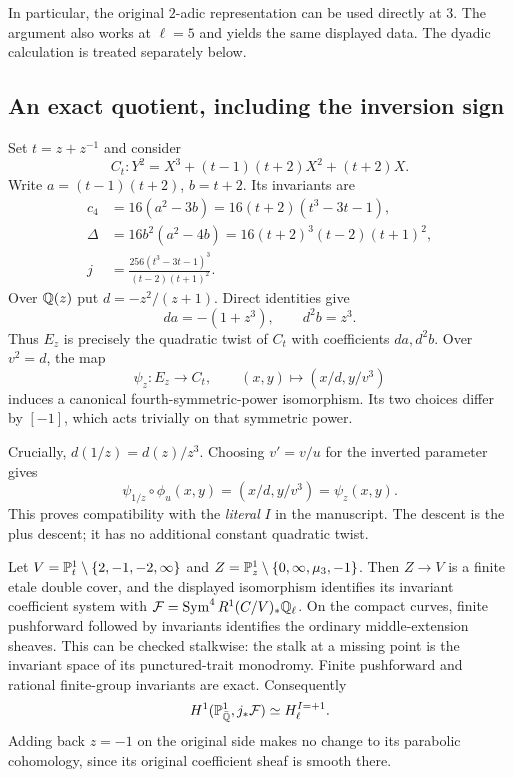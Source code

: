 In particular, the original $2$-adic representation can be used directly at
$3$. The argument also works at $\ell=5$ and yields the same displayed data.
The dyadic calculation is treated separately below.

\subsection{An exact quotient, including the inversion sign}
Set $t=z+z^{-1}$ and consider
\begin{equation}\label{p3:eq:family}
 C_t:Y^2=X^3+(t-1)(t+2)X^2+(t+2)X.
\end{equation}
Write $a=(t-1)(t+2)$, $b=t+2$. Its invariants are
\begin{align*}
 c_4&=16(a^2-3b)=16(t+2)(t^3-3t-1),\\
 \Delta&=16b^2(a^2-4b)=16(t+2)^3(t-2)(t+1)^2,\\
 j&=\frac{256(t^3-3t-1)^3}{(t-2)(t+1)^2}.
\end{align*}
Over $\mathbb Q(z)$ put $d=-z^2/(z+1)$. Direct identities give
\[
 da=-(1+z^3),\qquad d^2b=z^3.
\]
Thus $E_z$ is precisely the quadratic twist of $C_t$ with coefficients
$da,d^2b$. Over $v^2=d$, the map
\[
 \psi_z:E_z\longrightarrow C_t,\qquad(x,y)\longmapsto(x/d,y/v^3)
\]
induces a canonical fourth-symmetric-power isomorphism. Its two choices
differ by $[-1]$, which acts trivially on that symmetric power.

Crucially, $d(1/z)=d(z)/z^3$. Choosing $v'=v/u$ for the inverted parameter gives
\[
 \psi_{1/z}\circ\phi_u(x,y)=(x/d,y/v^3)=\psi_z(x,y).
\]
This proves compatibility with the \emph{literal} $I$ in the manuscript.
The descent is the plus descent; it has no additional constant quadratic twist.

Let $V=\mathbb P^1_t\setminus\{2,-1,-2,\infty\}$ and
$Z=\mathbb P^1_z\setminus\{0,\infty,\mu_3,-1\}$.
Then $Z\to V$ is a finite etale double cover, and the displayed isomorphism
identifies its invariant coefficient system with
$\mathcal F=\operatorname{Sym}^4R^1(C/V)_*\mathbb Q_\ell$.
On the compact curves, finite pushforward followed by invariants identifies
the ordinary middle-extension sheaves. This can be checked stalkwise:
the stalk at a missing point is the invariant space of its punctured-trait
monodromy. Finite pushforward and rational finite-group invariants are exact.
Consequently
\begin{equation}\label{p3:eq:plus}
 H^1(\mathbb P^1_{\bar{\mathbb Q}},j_*\mathcal F)\simeq H_\ell^{I=+1}.
\end{equation}
Adding back $z=-1$ on the original side makes no change to its parabolic
cohomology, since its original coefficient sheaf is smooth there.

